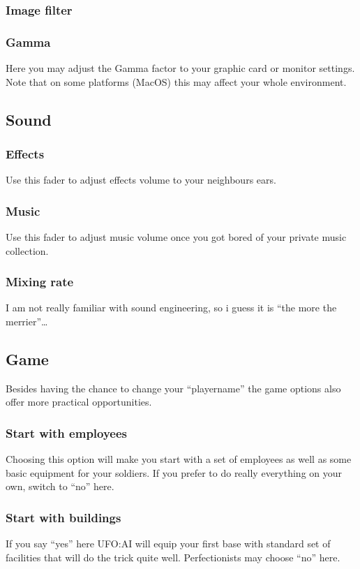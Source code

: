 \subsubsection*{Image filter}
\subsubsection*{Gamma}
Here you may adjust the Gamma factor to your graphic card or monitor settings.  Note that on some platforms (MacOS) this may affect your whole environment.

\subsection{Sound}
\subsubsection*{Effects}
Use this fader to adjust effects volume to your neighbours ears.
\subsubsection*{Music}
Use this fader to adjust music volume once you got bored of your private music collection.
\subsubsection*{Mixing rate}
I am not really familiar with sound engineering, so i guess it is ``the more the merrier''\ldots

\subsection{Game}
Besides having the chance to change your ``playername'' the game options also offer more practical opportunities.
\subsubsection*{Start with employees}
Choosing this option will make you start with a set of employees as well as some basic equipment for your soldiers. If you prefer to do really everything on your own, switch to ``no'' here.
\subsubsection*{Start with buildings}
If you say ``yes'' here UFO:AI will equip your first base with standard set of facilities that will do the trick quite well. Perfectionists may choose ``no'' here.
